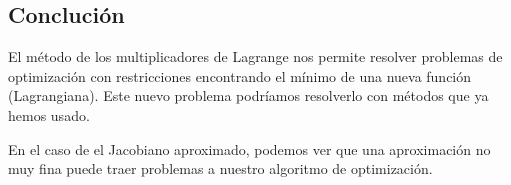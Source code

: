 \documentclass{article}
\begin{document}
\begin{multicols}{2}
\section{Conclución}

El método de los multiplicadores de Lagrange nos permite resolver problemas de optimización con restricciones encontrando el mínimo de una nueva función (Lagrangiana). Este nuevo problema podríamos resolverlo con métodos que ya hemos usado.

En el caso de el Jacobiano aproximado, podemos ver que una aproximación no muy fina puede traer problemas a nuestro algoritmo de optimización.
\newpage

\end{multicols}
\end{document}
